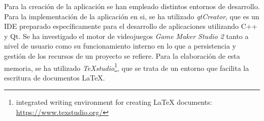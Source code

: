 Para la creación de la aplicación se han empleado distintos entornos de desarrollo.
Para la implementación de la aplicación en si, se ha utilizado \textit{qtCreator}, que es un IDE preparado específicamente para el desarrollo de aplicaciones utilizando C++ y Qt.
Se ha investigado el motor de videojuegos \textit{Game Maker Studio 2}\cite{gamemaker} tanto a nivel de usuario como su funcionamiento interno en lo que a persistencia y gestión de los recursos de un proyecto se refiere.
Para la elaboración de esta memoria, se ha utilizado \textit{TeXstudio}\footnote{integrated writing environment for creating LaTeX documents: \url{https://www.texstudio.org/}}, que se trata de un entorno que facilita la escritura de documentos LaTeX.